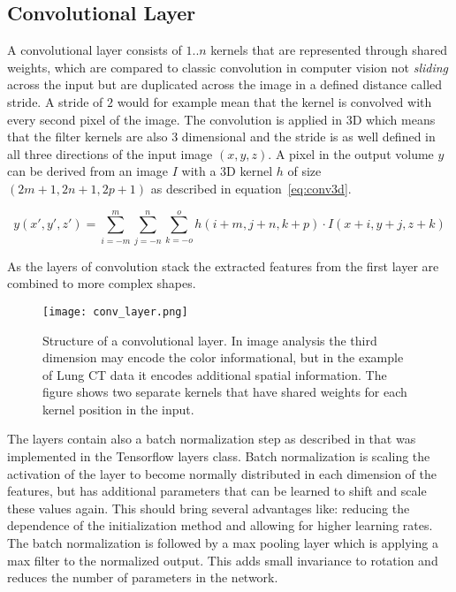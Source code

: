 \documentclass[main.tex]{subfiles}
\begin{document}
\subsection{Convolutional Layer}\label{ss:convlayer}
A convolutional layer consists of $1..n$ kernels that are represented through shared weights, which are compared to classic convolution in computer vision not \emph{sliding} across the input but are duplicated across the image in a defined distance called stride. A stride of $2$ would for example mean that the kernel is convolved with every second pixel of the image. The convolution is applied in 3D which means that the filter kernels are also 3 dimensional and the stride is as well defined in all three directions of the input image $(x,y,z)$. A pixel in the output volume $y$ can be derived from an image $I$ with a 3D kernel $h$ of size $(2m+1,2n+1,2p+1)$ as described in equation~\eqref{eq:conv3d}.

\begin{equation}
y(x',y',z')=\sum_{i = -m}^{m}\sum_{j = -n}^{n}\sum_{k=-o}^{o} h(i+m,j+n,k+p) \cdot I(x+i,y+j,z+k) 
\label{eq:conv3d}
\end{equation}
 
As the layers of convolution stack the extracted features from the first layer are combined to more complex shapes.

\begin{figure}
\begin{center}
\texttt{[image: conv\_layer.png]}
\end{center}
\caption{Structure of a convolutional layer. In image analysis the third dimension may encode the color informational, but in the example of Lung CT data it encodes additional spatial information. The figure shows two separate kernels that have shared weights for each kernel position in the input.}
\label{fig:conv_layer}
\end{figure}

The layers contain also a batch normalization step as described in \cite{ioffe2015batch} that was implemented in the Tensorflow layers class. Batch normalization is scaling the activation of the layer to become normally distributed in each dimension of the features, but has additional parameters that can be learned to shift and scale these values again. This should bring several advantages like: reducing the dependence of the initialization method and allowing for higher learning rates. The batch normalization is followed by a max pooling layer which is applying a max filter to the normalized output. This adds small invariance to rotation and reduces the number of parameters in the network.
\end{document}
